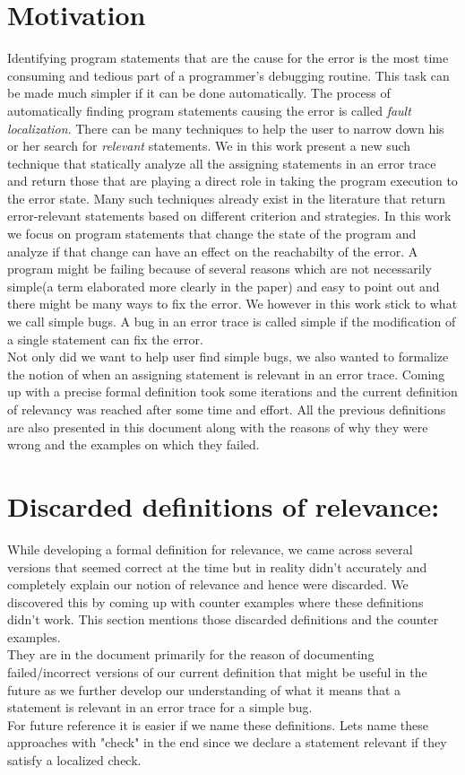 \documentclass{article}
\begin{document}
\section{Motivation}
Identifying program statements that are the cause for the error is the most time consuming and tedious part of a programmer's debugging routine. This task can be made much simpler if it can be done automatically. The process of automatically finding program statements causing the error is called \textit{fault localization}. There can be many techniques to help the user to narrow down his or her search for \textit{relevant} statements. We in this work present a new such technique that statically analyze all the assigning statements in an error trace and return those that are playing a direct role in taking the program execution to the error state. Many such techniques already exist in the literature that return error-relevant statements based on different criterion and strategies. In this work we focus on program statements that change the state of the program and analyze if that change can have an effect on the reachabilty of the error. A program might be failing because of several reasons which are not necessarily simple(a term elaborated more clearly in the paper) and easy to point out and there might be many ways to fix the error. We however in this work stick to what we call simple bugs. A bug in an error trace is called simple if the modification of a single statement can fix the error.\\
Not only did we want to help user find simple bugs, we also wanted to formalize the notion of when an assigning statement is relevant in an error trace.
Coming up with a precise formal definition took some iterations and the current definition of relevancy was reached after some time and effort. All the previous definitions are also presented in this document along with the reasons of why they were wrong and the examples on which they failed.
\section{Discarded definitions of relevance:}
While developing a formal definition for relevance, we came across several versions that seemed correct at the time but in reality didn't accurately and completely explain our notion of relevance and hence were discarded. We discovered this by coming up with counter examples where these definitions didn't work. This section mentions those discarded definitions and the counter examples.\\ 
They are in the document primarily for the reason of documenting failed/incorrect versions of our current definition that might be useful in the future as we further develop our understanding of what it means that a statement is relevant in an error trace for a simple bug. \\
For future reference it is easier if we name these definitions. Lets name these approaches with "check" in the end since we declare a statement relevant if they satisfy a localized check. 
\end{document}

